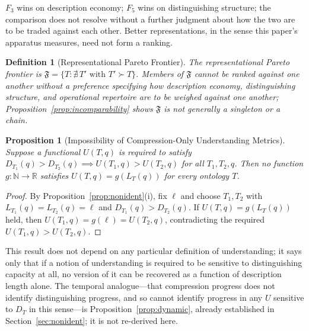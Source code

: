 \documentclass[11pt]{article}
\theoremstyle{plain}
\newtheorem{definition}{Definition}
\newtheorem{proposition}{Proposition}
\begin{document}
$F_3$ wins on description economy; $F_5$ wins on distinguishing structure; the comparison does not resolve without a further judgment about how the two are to be traded against each other. Better representations, in the sense this paper's apparatus measures, need not form a ranking.

\begin{definition}[Representational Pareto Frontier]
The representational Pareto frontier is $\mathfrak{F} = \{T : \nexists\, T' \text{ with } T' \succ T\}$. Members of $\mathfrak{F}$ cannot be ranked against one another without a preference specifying how description economy, distinguishing structure, and operational repertoire are to be weighed against one another; Proposition~\ref{prop:incomparability} shows $\mathfrak{F}$ is not generally a singleton or a chain.
\end{definition}

\begin{proposition}[Impossibility of Compression-Only Understanding Metrics]
\label{prop:no-understanding-metric}
Suppose a functional $U(T,q)$ is required to satisfy $D_{T_1}(q) > D_{T_2}(q) \implies U(T_1,q) > U(T_2,q)$ for all $T_1, T_2, q$. Then no function $g : \mathbb{N} \to \mathbb{R}$ satisfies $U(T,q) = g(L_T(q))$ for every ontology $T$.
\end{proposition}

\begin{proof}
By Proposition~\ref{prop:nonident}(i), fix $\ell$ and choose $T_1, T_2$ with $L_{T_1}(q) = L_{T_2}(q) = \ell$ and $D_{T_1}(q) > D_{T_2}(q)$. If $U(T,q) = g(L_T(q))$ held, then $U(T_1,q) = g(\ell) = U(T_2,q)$, contradicting the required $U(T_1,q) > U(T_2,q)$.
\end{proof}

This result does not depend on any particular definition of understanding; it says only that if a notion of understanding is required to be sensitive to distinguishing capacity at all, no version of it can be recovered as a function of description length alone. The temporal analogue---that compression progress does not identify distinguishing progress, and so cannot identify progress in any $U$ sensitive to $D_T$ in this sense---is Proposition~\ref{prop:dynamic}, already established in Section~\ref{sec:nonident}; it is not re-derived here.
\end{document}
